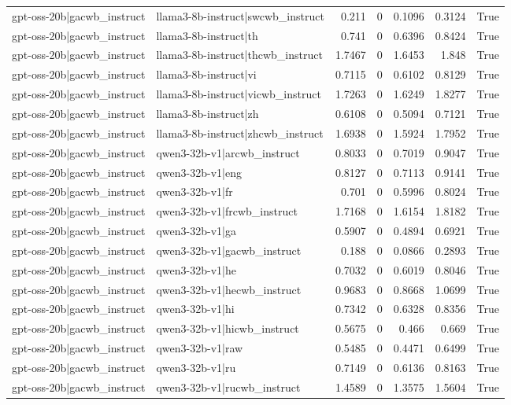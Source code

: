 \begin{table}
\begin{tabular}{l l r r r r l}
gpt-oss-20b|gacwb_instruct & llama3-8b-instruct|swcwb_instruct & 0.211 & 0 & 0.1096 & 0.3124 & True \\
gpt-oss-20b|gacwb_instruct & llama3-8b-instruct|th & 0.741 & 0 & 0.6396 & 0.8424 & True \\
gpt-oss-20b|gacwb_instruct & llama3-8b-instruct|thcwb_instruct & 1.7467 & 0 & 1.6453 & 1.848 & True \\
gpt-oss-20b|gacwb_instruct & llama3-8b-instruct|vi & 0.7115 & 0 & 0.6102 & 0.8129 & True \\
gpt-oss-20b|gacwb_instruct & llama3-8b-instruct|vicwb_instruct & 1.7263 & 0 & 1.6249 & 1.8277 & True \\
gpt-oss-20b|gacwb_instruct & llama3-8b-instruct|zh & 0.6108 & 0 & 0.5094 & 0.7121 & True \\
gpt-oss-20b|gacwb_instruct & llama3-8b-instruct|zhcwb_instruct & 1.6938 & 0 & 1.5924 & 1.7952 & True \\
gpt-oss-20b|gacwb_instruct & qwen3-32b-v1|arcwb_instruct & 0.8033 & 0 & 0.7019 & 0.9047 & True \\
gpt-oss-20b|gacwb_instruct & qwen3-32b-v1|eng & 0.8127 & 0 & 0.7113 & 0.9141 & True \\
gpt-oss-20b|gacwb_instruct & qwen3-32b-v1|fr & 0.701 & 0 & 0.5996 & 0.8024 & True \\
gpt-oss-20b|gacwb_instruct & qwen3-32b-v1|frcwb_instruct & 1.7168 & 0 & 1.6154 & 1.8182 & True \\
gpt-oss-20b|gacwb_instruct & qwen3-32b-v1|ga & 0.5907 & 0 & 0.4894 & 0.6921 & True \\
gpt-oss-20b|gacwb_instruct & qwen3-32b-v1|gacwb_instruct & 0.188 & 0 & 0.0866 & 0.2893 & True \\
gpt-oss-20b|gacwb_instruct & qwen3-32b-v1|he & 0.7032 & 0 & 0.6019 & 0.8046 & True \\
gpt-oss-20b|gacwb_instruct & qwen3-32b-v1|hecwb_instruct & 0.9683 & 0 & 0.8668 & 1.0699 & True \\
gpt-oss-20b|gacwb_instruct & qwen3-32b-v1|hi & 0.7342 & 0 & 0.6328 & 0.8356 & True \\
gpt-oss-20b|gacwb_instruct & qwen3-32b-v1|hicwb_instruct & 0.5675 & 0 & 0.466 & 0.669 & True \\
gpt-oss-20b|gacwb_instruct & qwen3-32b-v1|raw & 0.5485 & 0 & 0.4471 & 0.6499 & True \\
gpt-oss-20b|gacwb_instruct & qwen3-32b-v1|ru & 0.7149 & 0 & 0.6136 & 0.8163 & True \\
gpt-oss-20b|gacwb_instruct & qwen3-32b-v1|rucwb_instruct & 1.4589 & 0 & 1.3575 & 1.5604 & True \\

\end{tabular}
\end{table}
